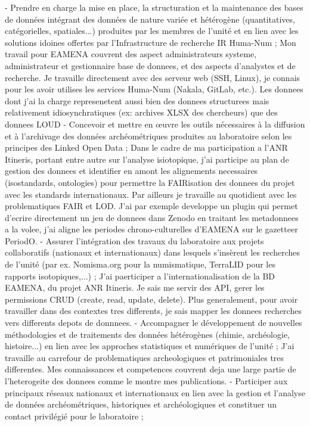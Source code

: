\documentclass[12pt]{article}
\begin{document}
- Prendre en charge la mise en place, la structuration et la maintenance des bases de données intégrant des données de nature variée et hétérogène (quantitatives, catégorielles, spatiales...) produites par les membres de l'unité et en lien avec les solutions idoines offertes par l'Infrastructure de recherche IR Huma-Num ;
Mon travail pour EAMENA couvrent des aspect administrateurs systeme, administrateur et gestionnaire base de donnees, et des aspects d'analystes et de recherche. Je travaille directement avec des serveur web (SSH, Linux), je connais pour les avoir utilises les services Huma-Num (Nakala, GitLab, etc.). Les donnees dont j'ai la charge represenetent aussi bien des donnees structurees mais relativement idiosynchratiques (ex: archives XLSX des chercheurs) que des donnees LOUD 
- Concevoir et mettre en œuvre les outils nécessaires à la diffusion et à l'archivage des données archéométriques produites au laboratoire selon les principes des Linked Open Data ;
Dans le cadre de ma participation a l'ANR Itineris, portant entre autre sur l'analyse isiotopique, j'ai participe au plan de gestion des donnees et identifier en amont les alignements necessaires (isostandards, ontologies) pour permettre la FAIRisation des donnees du projet avec les standards internationaux. Par ailleurs je travaille au quotidient avec les problematiques FAIR et LOD. J'ai par exemple developpe un plugin qui permet d'ecrire directement un jeu de donnees dans Zenodo en traitant les metadonnees a la volee, j'ai aligne les periodes chrono-culturelles d'EAMENA sur le gazetteer PeriodO. 
- Assurer l'intégration des travaux du laboratoire aux projets collaboratifs (nationaux et internationaux) dans lesquels s'insèrent les recherches de l'unité (par ex. Nomisma.org pour la numismatique, TerraLID pour les rapports isotopiques,...) ;
J'ai paerticiper a l'internationalisation de la BD EAMENA, du projet ANR Itineris. Je sais me servir des API, gerer les permissions CRUD (create, read, update, delete). Plus generalement, pour avoir travailler dans des contextes tres differents, je sais mapper les donnees recherches vers differents depots de donnnees.
- Accompagner le développement de nouvelles méthodologies et de traitements des données hétérogènes (chimie, archéologie, histoire...) en lien avec les approches statistiques et numériques de l'unité ;
J'ai travaille au carrefour de problematiques archeologiques et patrimoniales tres differentes. Mes connaissances et competences couvrent deja une large partie de l'heterogeite des donnees comme le montre mes publications.
- Participer aux principaux réseaux nationaux et internationaux en lien avec la gestion et l'analyse de données archéométriques, historiques et archéologiques et constituer un contact privilégié pour le laboratoire ;
\end{document}
